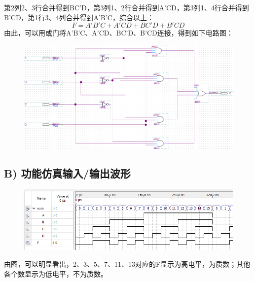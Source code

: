 \documentclass[UTF8]{ctexart}
\begin{document}
第2列2、3行合并得到BC'D，第3列1、2行合并得到A'CD，第3列1、4行合并得到B'CD，第1行3、4列合并得到A'B'C，综合以上：
\[F=A'B'C+A'CD+BC'D+B'CD\]
由此，可以用或门将A'B'C、A'CD、BC'D、B'CD连接，得到如下电路图：
\begin{figure}[H]\centering
    {
    \includegraphics[scale=1.0]{curcuit.PNG}
    }
    \end{figure}

\subsection*{ B) 功能仿真输入/输出波形}

\begin{figure}[H]\centering
    {
    \includegraphics[scale=0.9]{wave.PNG}
    }
\end{figure}
由图，可以明显看出，2、3、5、7、11、13对应的F显示为高电平，为质数；其他各个数显示为低电平，不为质数。
\end{document}
